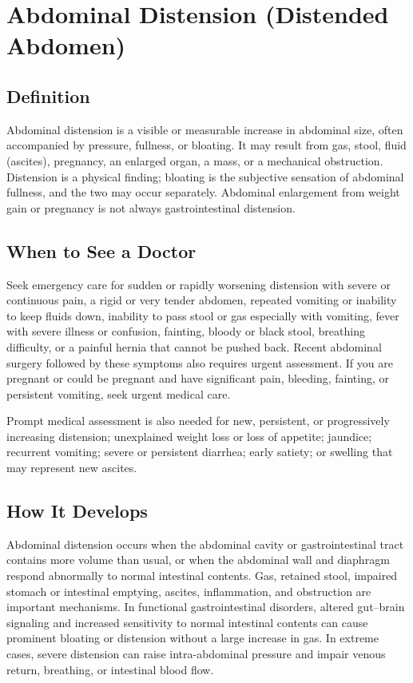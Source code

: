 \chapter{Abdominal Distension (Distended Abdomen)}

\section*{Definition}
Abdominal distension is a visible or measurable increase in abdominal size, often accompanied by pressure, fullness, or bloating. It may result from gas, stool, fluid (ascites), pregnancy, an enlarged organ, a mass, or a mechanical obstruction. Distension is a physical finding; bloating is the subjective sensation of abdominal fullness, and the two may occur separately. Abdominal enlargement from weight gain or pregnancy is not always gastrointestinal distension.

\section*{When to See a Doctor}
Seek emergency care for sudden or rapidly worsening distension with severe or continuous pain, a rigid or very tender abdomen, repeated vomiting or inability to keep fluids down, inability to pass stool or gas especially with vomiting, fever with severe illness or confusion, fainting, bloody or black stool, breathing difficulty, or a painful hernia that cannot be pushed back. Recent abdominal surgery followed by these symptoms also requires urgent assessment. If you are pregnant or could be pregnant and have significant pain, bleeding, fainting, or persistent vomiting, seek urgent medical care.

Prompt medical assessment is also needed for new, persistent, or progressively increasing distension; unexplained weight loss or loss of appetite; jaundice; recurrent vomiting; severe or persistent diarrhea; early satiety; or swelling that may represent new ascites.

\section*{How It Develops}
Abdominal distension occurs when the abdominal cavity or gastrointestinal tract contains more volume than usual, or when the abdominal wall and diaphragm respond abnormally to normal intestinal contents. Gas, retained stool, impaired stomach or intestinal emptying, ascites, inflammation, and obstruction are important mechanisms. In functional gastrointestinal disorders, altered gut--brain signaling and increased sensitivity to normal intestinal contents can cause prominent bloating or distension without a large increase in gas. In extreme cases, severe distension can raise intra-abdominal pressure and impair venous return, breathing, or intestinal blood flow.


